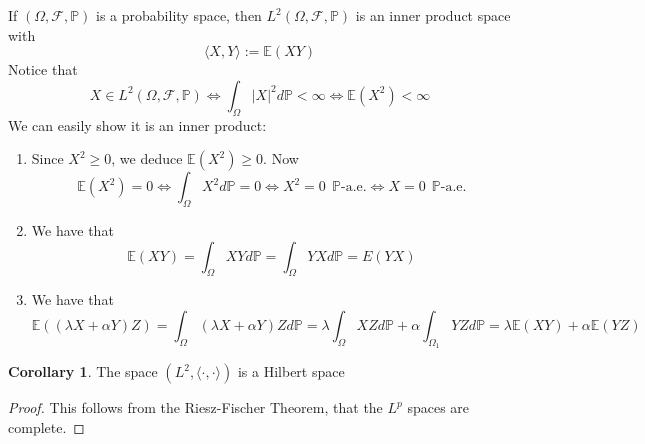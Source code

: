 \documentclass[11pt,a4paper]{article}
\theoremstyle{definition}
\newtheorem{corollary}{Corollary}[section]
\begin{document}
    If $(\Omega, \mathcal{F}, \mathbb{P})$ is a probability space, then $L^2(\Omega, \mathcal{F}, \mathbb{P})$ is an inner product space with \[\langle X,Y \rangle := \mathbb{E}(XY)\]Notice that \[
    X \in L^2 (\Omega, \mathcal{F}, \mathbb{P}) \iff \int _\Omega |X|^2 d \mathbb{P} < \infty \iff \mathbb{E}(X^2) < \infty \]We can easily show it is an inner product: \begin{enumerate}
        \item Since $X^2 \ge 0$, we deduce $\mathbb{E} (X^2) \ge 0$. Now \[
        \mathbb{E}(X^2) = 0 \iff \int _\Omega X^2 d\mathbb{P} = 0 \iff X^2 = 0 \ \ \mathbb{P} \text{-a.e.} \iff X = 0 \ \ \mathbb{P} \text{-a.e.}
        \]
        \item We have that \[
        \mathbb{E} (XY) = \int _\Omega XY d \mathbb{P} = \int _{\Omega} YX d \mathbb{P} = E(YX)
        \]
        \item We have that \[
        \mathbb{E} ((\lambda X + \alpha Y)Z) = \int _\Omega (\lambda X + \alpha Y)Z d \mathbb{P} = \lambda \int _{\Omega} XZ d \mathbb{P} + \alpha \int _{\Omega_1} YZ d \mathbb{P} = \lambda \mathbb{E}(XY) + \alpha \mathbb{E} (YZ)
        \]
    \end{enumerate}

\begin{corollary}
The space $(L^2, \langle \cdot, \cdot \rangle)$ is a Hilbert space
\end{corollary}
\begin{proof}
This follows from the Riesz-Fischer Theorem, that the $L^p$ spaces are complete.
\end{proof}
\end{document}
